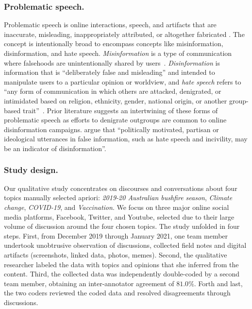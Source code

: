 \subsubsection{Problematic speech.}
Problematic speech is online interactions, speech, and artifacts that are inaccurate, misleading, inappropriately attributed, or altogether fabricated \citep{jack2017lexicon}.
The concept is intentionally broad to encompass concepts like misinformation, disinformation, and hate speech.
\emph{Misinformation} is a type of communication where falsehoods are unintentionally shared by users~\citep[p.~2]{jack2017lexicon}.
\emph{Disinformation} is information that is ``deliberately false and misleading'' \citep[p.~3]{jack2017lexicon} and intended to manipulate users to a particular opinion or worldview, and
\emph{hate speech} refers to ``any form of communication in which others are attacked, denigrated, or intimidated based on religion, ethnicity, gender, national origin, or another group-based trait''~\citep{warner2012detecting,hameleers2021civilized}.
Prior literature suggests an intertwining of these forms of problematic speech as efforts to denigrate outgroups are common to online disinformation campaigns.
\citet{hameleers2021civilized} argue that ``politically motivated, partisan or ideological utterances in false information, such as hate speech and incivility, may be an indicator of disinformation''.

\subsubsection{Study design.}\label{sssec:study_design}
Our qualitative study concentrates on discourses and conversations about four topics manually selected apriori: \textit{2019-20 Australian bushfire season}, \textit{Climate change}, \textit{COVID-19}, and \textit{Vaccination}.
We focus on three major online social media platforms, Facebook, Twitter, and Youtube, selected due to their large volume of discussion around the four chosen topics.
The study unfolded in four steps.
First, from December 2019 through January 2021, one team member undertook unobtrusive observation of discussions, collected field notes and digital artifacts (screenshots, linked data, photos, memes).
Second, the qualitative researcher labeled the data with topics and opinions that she inferred from the content.
Third, the collected data was independently double-coded by a second team member, obtaining an inter-annotator agreement of $81.0\%$.
Forth and last, the two coders reviewed the coded data and resolved disagreements through discussions.

